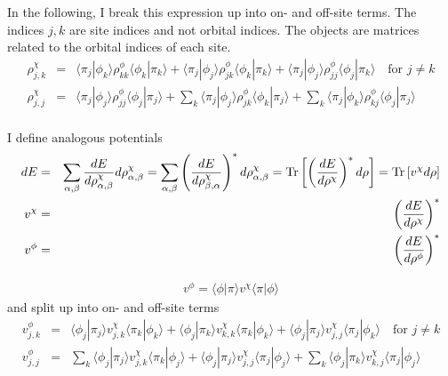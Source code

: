 \documentclass[11pt,a4paper]{report}
\begin{document}
In the following, I break this expression up into on- and off-site terms.
The indices $j,k$ are site indices and not orbital indices. The
objects are matrices related to the orbital indices of each site.
\begin{eqnarray}
\rho^\chi_{j,k}
&=&\langle\pi_j|\phi_k\rangle\rho^\phi_{kk}\langle\phi_k|\pi_k\rangle
+\langle\pi_j|\phi_j\rangle\rho^\phi_{jk}\langle\phi_k|\pi_k\rangle
+\langle\pi_j|\phi_j\rangle\rho^\phi_{jj}\langle\phi_j|\pi_k\rangle
\quad\text{for $j\neq k$}
\nonumber\\
\rho^\chi_{j,j}
&=&\langle\pi_j|\phi_j\rangle\rho^\phi_{jj}\langle\phi_j|\pi_j\rangle
+\sum_k\langle\pi_j|\phi_j\rangle\rho^\phi_{jk}\langle\phi_k|\pi_j\rangle
+\sum_k\langle\pi_j|\phi_k\rangle\rho^\phi_{kj}\langle\phi_j|\pi_j\rangle
\nonumber\\
\end{eqnarray}

I define analogous potentials
\begin{eqnarray}
dE&=&
\sum_{\alpha,\beta}
\frac{dE}{d\rho^\chi_{\alpha,\beta}}d\rho^{\chi}_{\alpha,\beta}
=\sum_{\alpha,\beta}
\left(\frac{dE}{d\rho^\chi_{\beta,\alpha}}\right)^* d\rho^{\chi}_{\alpha,\beta}
=\mathrm{Tr}\left[\left(\frac{dE}{d\rho^\chi}\right)^* d\rho\right]
=\mathrm{Tr}\left[v^\chi d\rho\right]
\nonumber\\
v^\chi&=&\left(\frac{dE}{d\rho^\chi}\right)^*
\nonumber\\
v^\phi&=&\left(\frac{dE}{d\rho^\phi}\right)^*
\end{eqnarray}



\begin{eqnarray}
v^\phi=\langle\phi|\pi\rangle v^\chi \langle\pi|\phi\rangle
\end{eqnarray}
and split up into on- and off-site terms
\begin{eqnarray}
v^\phi_{j,k}
&=&
\langle\phi_j|\pi_j\rangle v^\chi_{j,k} \langle\pi_k|\phi_k\rangle
+\langle\phi_j|\pi_k\rangle v^\chi_{k,k} \langle\pi_k|\phi_k\rangle
+\langle\phi_j|\pi_j\rangle v^\chi_{j,j} \langle\pi_j|\phi_k\rangle
\quad\text{for $j\neq k$}
\nonumber\\
%
v^\phi_{j,j}&=&
\sum_k\langle\phi_j|\pi_j\rangle v^\chi_{j,k} \langle\pi_k|\phi_j\rangle
+\langle\phi_j|\pi_j\rangle v^\chi_{j,j} \langle\pi_j|\phi_j\rangle
+\sum_k\langle\phi_j|\pi_k\rangle v^\chi_{k,j} \langle\pi_j|\phi_j\rangle
\end{eqnarray}


\end{document}
